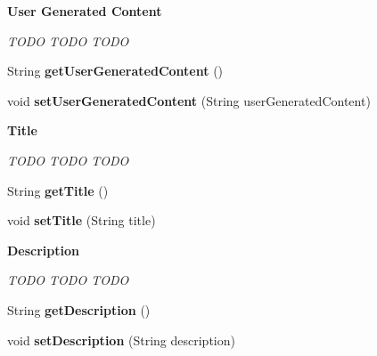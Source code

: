 \begin{Indent}{\bf User Generated Content}\par
{\em \label{_amgrp6bd7bb1c921e3d0f37d0bb2fc4b1cc18}
 TODO TODO TODO }\begin{DoxyCompactItemize}
\item 
\hypertarget{classcom_1_1janrain_1_1android_1_1engage_1_1types_1_1_j_r_activity_object_a8be50b9e9701b2ebda10ec9b79245175}{
String {\bfseries getUserGeneratedContent} ()}
\label{classcom_1_1janrain_1_1android_1_1engage_1_1types_1_1_j_r_activity_object_a8be50b9e9701b2ebda10ec9b79245175}

\item 
\hypertarget{classcom_1_1janrain_1_1android_1_1engage_1_1types_1_1_j_r_activity_object_ae086330e2c43749d05930c201e2c8a6d}{
void {\bfseries setUserGeneratedContent} (String userGeneratedContent)}
\label{classcom_1_1janrain_1_1android_1_1engage_1_1types_1_1_j_r_activity_object_ae086330e2c43749d05930c201e2c8a6d}

\end{DoxyCompactItemize}
\end{Indent}
\begin{Indent}{\bf Title}\par
{\em \label{_amgrpb78a3223503896721cca1303f776159b}
 TODO TODO TODO }\begin{DoxyCompactItemize}
\item 
\hypertarget{classcom_1_1janrain_1_1android_1_1engage_1_1types_1_1_j_r_activity_object_a888f94790c968e3f0b5de17e509098aa}{
String {\bfseries getTitle} ()}
\label{classcom_1_1janrain_1_1android_1_1engage_1_1types_1_1_j_r_activity_object_a888f94790c968e3f0b5de17e509098aa}

\item 
\hypertarget{classcom_1_1janrain_1_1android_1_1engage_1_1types_1_1_j_r_activity_object_a7d4a73d6a1db487dd96f658bdbc98ae9}{
void {\bfseries setTitle} (String title)}
\label{classcom_1_1janrain_1_1android_1_1engage_1_1types_1_1_j_r_activity_object_a7d4a73d6a1db487dd96f658bdbc98ae9}

\end{DoxyCompactItemize}
\end{Indent}
\begin{Indent}{\bf Description}\par
{\em \label{_amgrpb5a7adde1af5c87d7fd797b6245c2a39}
 TODO TODO TODO }\begin{DoxyCompactItemize}
\item 
\hypertarget{classcom_1_1janrain_1_1android_1_1engage_1_1types_1_1_j_r_activity_object_ac7feffb7a33f63504ff1f87f19e2d2d8}{
String {\bfseries getDescription} ()}
\label{classcom_1_1janrain_1_1android_1_1engage_1_1types_1_1_j_r_activity_object_ac7feffb7a33f63504ff1f87f19e2d2d8}

\item 
\hypertarget{classcom_1_1janrain_1_1android_1_1engage_1_1types_1_1_j_r_activity_object_a1d15d718177c4f5411ce6ab339889fd4}{
void {\bfseries setDescription} (String description)}
\label{classcom_1_1janrain_1_1android_1_1engage_1_1types_1_1_j_r_activity_object_a1d15d718177c4f5411ce6ab339889fd4}

\end{DoxyCompactItemize}
\end{Indent}
